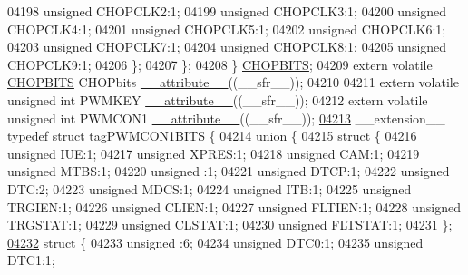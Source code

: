 \begin{DoxyCode}
04198       \textcolor{keywordtype}{unsigned} CHOPCLK2:1;
04199       \textcolor{keywordtype}{unsigned} CHOPCLK3:1;
04200       \textcolor{keywordtype}{unsigned} CHOPCLK4:1;
04201       \textcolor{keywordtype}{unsigned} CHOPCLK5:1;
04202       \textcolor{keywordtype}{unsigned} CHOPCLK6:1;
04203       \textcolor{keywordtype}{unsigned} CHOPCLK7:1;
04204       \textcolor{keywordtype}{unsigned} CHOPCLK8:1;
04205       \textcolor{keywordtype}{unsigned} CHOPCLK9:1;
04206     \};
04207   \};
04208 \} \hyperlink{a00008_d6/d82/a00293}{CHOPBITS};
04209 \textcolor{keyword}{extern} \textcolor{keyword}{volatile} \hyperlink{a00008_d6/d82/a00293}{CHOPBITS} CHOPbits \hyperlink{a00009_a493c46f03454991ccc5aa7a6e1dfb2a7}{\_\_attribute\_\_}((\_\_sfr\_\_));
04210 
04211 \textcolor{keyword}{extern} \textcolor{keyword}{volatile} \textcolor{keywordtype}{unsigned} \textcolor{keywordtype}{int}  PWMKEY \hyperlink{a00009_a493c46f03454991ccc5aa7a6e1dfb2a7}{\_\_attribute\_\_}((\_\_sfr\_\_));
04212 \textcolor{keyword}{extern} \textcolor{keyword}{volatile} \textcolor{keywordtype}{unsigned} \textcolor{keywordtype}{int}  PWMCON1 \hyperlink{a00009_a493c46f03454991ccc5aa7a6e1dfb2a7}{\_\_attribute\_\_}((\_\_sfr\_\_));
\hypertarget{a00009_source_l04213}{}\hyperlink{a00008}{04213} \_\_extension\_\_ \textcolor{keyword}{typedef} \textcolor{keyword}{struct }tagPWMCON1BITS \{
\hypertarget{a00009_source_l04214}{}\hyperlink{a00009}{04214}   \textcolor{keyword}{union }\{
\hypertarget{a00009_source_l04215}{}\hyperlink{a00009}{04215}     \textcolor{keyword}{struct }\{
04216       \textcolor{keywordtype}{unsigned} IUE:1;
04217       \textcolor{keywordtype}{unsigned} XPRES:1;
04218       \textcolor{keywordtype}{unsigned} CAM:1;
04219       \textcolor{keywordtype}{unsigned} MTBS:1;
04220       \textcolor{keywordtype}{unsigned} :1;
04221       \textcolor{keywordtype}{unsigned} DTCP:1;
04222       \textcolor{keywordtype}{unsigned} DTC:2;
04223       \textcolor{keywordtype}{unsigned} MDCS:1;
04224       \textcolor{keywordtype}{unsigned} ITB:1;
04225       \textcolor{keywordtype}{unsigned} TRGIEN:1;
04226       \textcolor{keywordtype}{unsigned} CLIEN:1;
04227       \textcolor{keywordtype}{unsigned} FLTIEN:1;
04228       \textcolor{keywordtype}{unsigned} TRGSTAT:1;
04229       \textcolor{keywordtype}{unsigned} CLSTAT:1;
04230       \textcolor{keywordtype}{unsigned} FLTSTAT:1;
04231     \};
\hypertarget{a00009_source_l04232}{}\hyperlink{a00009}{04232}     \textcolor{keyword}{struct }\{
04233       \textcolor{keywordtype}{unsigned} :6;
04234       \textcolor{keywordtype}{unsigned} DTC0:1;
04235       \textcolor{keywordtype}{unsigned} DTC1:1;

\end{DoxyCode}

